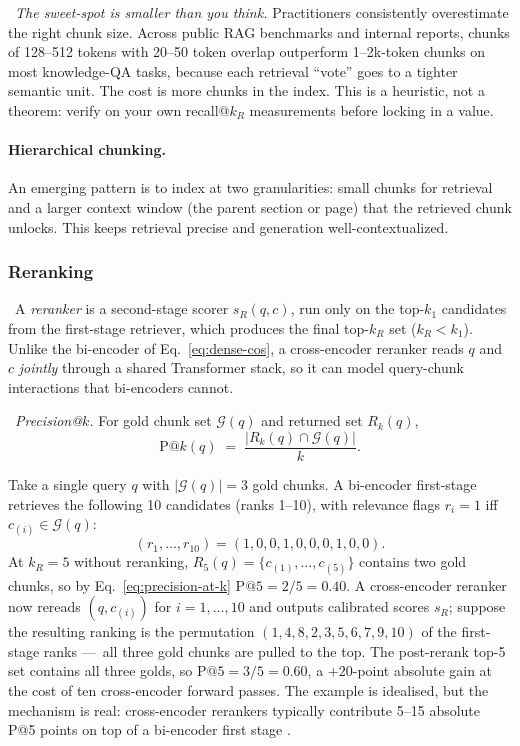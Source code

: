 \Heur\ \emph{The sweet-spot is smaller than you think.}
Practitioners consistently overestimate the right chunk size.
Across public RAG benchmarks and internal reports, chunks of
128--512 tokens with 20--50 token overlap outperform 1--2k-token
chunks on most knowledge-QA tasks, because each retrieval ``vote''
goes to a tighter semantic unit. The cost is more chunks in the
index. This is a heuristic, not a theorem: verify on your own
recall@$k_R$ measurements before locking in a value.

\paragraph{Hierarchical chunking.}
An emerging pattern is to index at two granularities: small chunks
for retrieval and a larger context window (the parent section or
page) that the retrieved chunk unlocks. This keeps retrieval
precise and generation well-contextualized.

\subsubsection{Reranking}

\Def\ A \emph{reranker} is a second-stage scorer $s_R(q, c)$, run
only on the top-$k_1$ candidates from the first-stage retriever,
which produces the final top-$k_R$ set ($k_R < k_1$). Unlike the
bi-encoder of Eq.~\eqref{eq:dense-cos}, a cross-encoder reranker
reads $q$ and $c$ \emph{jointly} through a shared Transformer
stack, so it can model query-chunk interactions that bi-encoders
cannot.

\Def\ \emph{Precision@$k$.} For gold chunk set $\mathcal{G}(q)$ and
returned set $R_k(q)$,
\begin{equation}
  \mathrm{P@}k(q)
  \;=\; \frac{\bigl|R_k(q) \cap \mathcal{G}(q)\bigr|}{k}.
  \label{eq:precision-at-k}
\end{equation}

\begin{workedexample}
Take a single query $q$ with $|\mathcal{G}(q)| = 3$ gold chunks. A
bi-encoder first-stage retrieves the following 10 candidates (ranks
1--10), with relevance flags $r_i = 1$ iff $c_{(i)} \in \mathcal{G}(q)$:
\[
  (r_1, \dots, r_{10}) = (1, 0, 0, 1, 0, 0, 0, 1, 0, 0).
\]
At $k_R = 5$ without reranking, $R_5(q) = \{c_{(1)}, \dots, c_{(5)}\}$
contains two gold chunks, so by
Eq.~\eqref{eq:precision-at-k} $\mathrm{P@}5 = 2/5 = 0.40$. A
cross-encoder reranker now rereads $(q, c_{(i)})$ for $i = 1, \dots,
10$ and outputs calibrated scores $s_R$; suppose the resulting
ranking is the permutation
$(1, 4, 8, 2, 3, 5, 6, 7, 9, 10)$ of the first-stage ranks
---~all three gold chunks are pulled to the top. The post-rerank
top-5 set contains all three golds, so
$\mathrm{P@}5 = 3/5 = 0.60$, a $+20$-point absolute gain at the
cost of ten cross-encoder forward passes. The example is
idealised, but the mechanism is real: cross-encoder rerankers
typically contribute 5--15 absolute P@5 points on top of a
bi-encoder first stage \citep{nogueira2020monobert}.
\end{workedexample}

